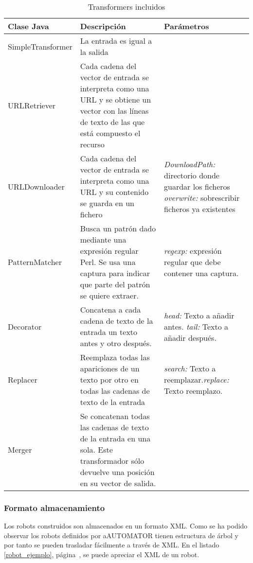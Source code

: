 \begin{table}[!hbp]
\small{
\begin{tabular}{l p{6cm} p{5cm}}
Clase Java & Descripción & Parámetros \\ \hline

SimpleTransformer & La entrada es igual a la salida & \\ \hline
URLRetriever & Cada cadena del vector de entrada se interpreta como
una URL y se obtiene un vector con las líneas de texto de las que está
compuesto el recurso & \\ \hline URLDownloader & Cada cadena del
vector de entrada se interpreta como una URL y su contenido se guarda
en un fichero & \emph{DownloadPath:} directorio donde guardar los
ficheros \linebreak[4] \emph{overwrite:} sobrescribir ficheros ya
existentes \\ \hline PatternMatcher & Busca un patrón dado mediante
una expresión regular Perl. Se usa una captura para indicar que parte
del patrón se quiere extraer. & \emph{regexp:} expresión regular que
debe contener una captura.\\ \hline
Decorator & Concatena a cada cadena de
texto de la entrada un texto antes y otro después. & \emph{head:}
Texto a añadir antes. \linebreak[4] \emph{tail:} Texto a añadir
después.\\ \hline
Replacer & Reemplaza todas las apariciones de un texto por
otro en todas las cadenas de texto de la entrada & \emph{search:}
Texto a reemplazar.\linebreak[4] \emph{replace:} Texto reemplazo. \\
\hline
Merger & Se concatenan todas las cadenas de texto de la entrada en
una sola. Este transformador sólo devuelve una posición en su vector
de salida.
\end{tabular}
}
\caption{Transformers incluidos}
\label{transformers_incluidos}
\end{table}

\subsubsection{Formato almacenamiento}
\label{formato_almacenamiento}
Los robots construidos son almacenados en un formato XML. Como se ha
podido observar los robots definidos por aAUTOMATOR tienen estructura
de árbol y por tanto se pueden trasladar fácilmente a través de XML.
En el listado \ref{robot_ejemplo}, página~\pageref{robot_ejemplo}, se
puede apreciar el XML de un robot.

